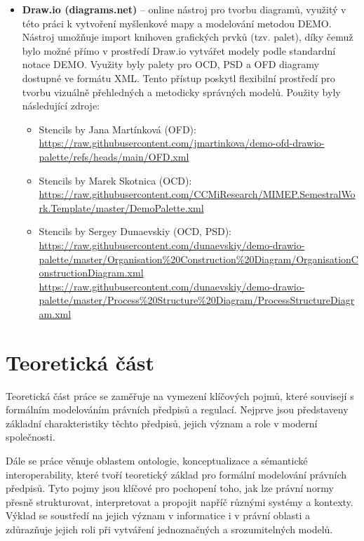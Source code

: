 \begin{itemize}
  \item \textbf{Draw.io (diagrams.net)} – online nástroj pro tvorbu diagramů, využitý v této práci k vytvoření myšlenkové mapy a modelování metodou DEMO. Nástroj umožňuje import knihoven grafických prvků (tzv. palet), díky čemuž bylo možné přímo v prostředí Draw.io vytvářet modely podle standardní notace DEMO. Využity byly palety pro OCD, PSD a OFD diagramy dostupné ve formátu XML. Tento přístup poskytl flexibilní prostředí pro tvorbu vizuálně přehledných a metodicky správných modelů.
  \noindent Použity byly následující zdroje:
  \begin{itemize}
    \item Stencils by Jana Martínková (OFD):\\
    \url{https://raw.githubusercontent.com/jmartinkova/demo-ofd-drawio-palette/refs/heads/main/OFD.xml}
    \item Stencils by Marek Skotnica (OCD):\\
    \url{https://raw.githubusercontent.com/CCMiResearch/MIMEP.SemestralWork.Template/master/DemoPalette.xml}
    \item Stencils by Sergey Dunaevskiy (OCD, PSD):\\
    \url{https://raw.githubusercontent.com/dunaevskiy/demo-drawio-palette/master/Organisation%20Construction%20Diagram/OrganisationConstructionDiagram.xml}\\       \url{https://raw.githubusercontent.com/dunaevskiy/demo-drawio-palette/master/Process%20Structure%20Diagram/ProcessStructureDiagram.xml}
  \end{itemize}
\end{itemize}


\chapter{Teoretická část}  \label{sec:teoretická-část}
Teoretická část práce se zaměřuje na vymezení klíčových pojmů, které souvisejí s formálním modelováním právních předpisů a regulací. Nejprve jsou představeny základní charakteristiky těchto předpisů, jejich význam a role v moderní společnosti.

Dále se práce věnuje oblastem ontologie, konceptualizace a sémantické interoperability, které tvoří teoretický základ pro formální modelování právních předpisů. Tyto pojmy jsou klíčové pro pochopení toho, jak lze právní normy přesně strukturovat, interpretovat a propojit napříč různými systémy a kontexty. Výklad se soustředí na jejich význam v informatice i v právní oblasti a zdůrazňuje jejich roli při vytváření jednoznačných a srozumitelných modelů.

